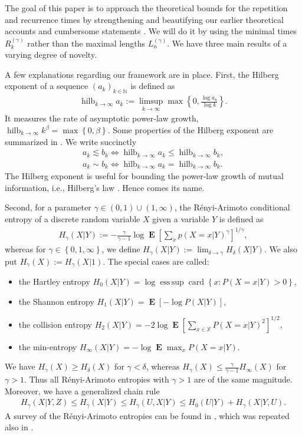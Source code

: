 \documentclass[a4paper,12pt]{article}
\newcommand{\kwad}[1]{\left[ #1 \right]}
\newcommand{\klam}[1]{\left\{ #1 \right\}}
\DeclareMathOperator*{\hilberg}{hilb}
\DeclareMathOperator{\esssup}{ess\, sup}
\DeclareMathOperator{\card}{card}
\DeclareMathOperator{\mean}{\mathbf{E}}
\begin{document}
The goal of this paper is to approach the theoretical bounds for the
repetition and recurrence times by strengthening and beautifying our
earlier theoretical accounts and cumbersome statements
\citep{Debowski15f,Debowski18b,Debowski21}. We will do it by using the
minimal times $R^{(\gamma)}_k$ rather than the maximal lengths
$L^{(\gamma)}_n$. We have three main results of a varying degree of
novelty.

A few explanations regarding our framework are in place.  First, the
Hilberg exponent of a sequence $(a_k)_{k\in\mathbb{N}}$ is defined as
\begin{align}
  \label{Exponent}
  \hilberg_{k\rightarrow\infty} a_k
  :=\limsup_{k\rightarrow\infty} \max\klam{0,\frac{\log
  a_k}{\log k}}
  .
\end{align}
It measures the rate of asymptotic power-law growth,
$\hilberg_{k\rightarrow\infty} k^\beta=\max\klam{0,\beta}$. Some
properties of the Hilberg exponent are summarized in \citep[Section
8.1]{Debowski21}. We write succinctly
\begin{align}
  a_k\lesssim b_k\iff
  \hilberg_{k\rightarrow\infty} a_k\le
  \hilberg_{k\rightarrow\infty} b_k,
  \\
  a_k\sim b_k\iff
  \hilberg_{k\rightarrow\infty} a_k=
  \hilberg_{k\rightarrow\infty} b_k.
\end{align}
The Hilberg exponent is useful for bounding the power-law growth of
mutual information, i.e., Hilberg's law \citep[Chapter
8]{Debowski21}. Hence comes its name.

Second, for a parameter $\gamma\in(0,1)\cup(1,\infty)$, the
R\'enyi-Arimoto conditional entropy of a discrete random variable $X$
given a variable $Y$ is defined as
\begin{align}
  \label{RenyiArimoto}
  H_\gamma(X|Y):=
  -\frac{\gamma}{\gamma-1}\log
  \mean\kwad{\sum_x p(X=x|Y)^{\gamma}}^{1/\gamma}
  ,
\end{align}
whereas for $\gamma\in\klam{0,1,\infty}$, we define
$H_\gamma(X|Y):=\lim_{\delta\rightarrow\gamma} H_\delta(X|Y)$.  We
also put $H_\gamma(X):=H_\gamma(X|1)$. The special cases are called:
\begin{itemize}
\item the Hartley entropy
$H_0(X|Y)= \log \esssup\card\klam{x: P(X=x|Y)>0}$,
\item  the Shannon
entropy $H_1(X|Y)=\mean\kwad{-\log P(X|Y)}$, 
\item the collision entropy
$H_2(X|Y)=-2\log \mean\kwad{\sum_{x\in\mathbb{X}} P(X=x|Y)^2}^{1/2}$,
\item the min-entropy $H_\infty(X|Y)=-\log \mean\max_{x} P(X=x|Y)$.
\end{itemize}
We have $H_\gamma(X)\ge H_\delta(X)$ for $\gamma<\delta$, whereas
$H_\gamma(X)\le \frac{\gamma}{\gamma-1}H_\infty(X)$ for $\gamma>1$.
Thus all R\'enyi-Arimoto entropies with $\gamma>1$ are of the same
magnitude.  Moreover, we have a generalized chain rule
\begin{align}
  \label{Chain}
  H_\gamma(X|Y,Z)\le H_\gamma(X|Y)\le H_\gamma(U,X|Y)\le
  H_0(U|Y)+H_\gamma(X|Y,U).
\end{align}
A survey of the R\'enyi-Arimoto entropies can be found in
\citep{FehrBerens14}, which was repeated also in \citep[Section
9.1]{Debowski21}.
\end{document}
